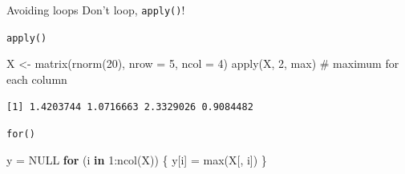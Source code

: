 \documentclass[
  ignorenonframetext,
]{beamer}
\newenvironment{Shaded}{\begin{snugshade}}{\end{snugshade}}
\newcommand{\AttributeTok}[1]{\textcolor[rgb]{0.00,0.34,0.68}{#1}}
\newcommand{\CommentTok}[1]{\textcolor[rgb]{0.54,0.53,0.53}{#1}}
\newcommand{\ConstantTok}[1]{\textcolor[rgb]{0.67,0.33,0.00}{#1}}
\newcommand{\ControlFlowTok}[1]{\textcolor[rgb]{0.12,0.11,0.11}{\textbf{#1}}}
\newcommand{\DecValTok}[1]{\textcolor[rgb]{0.69,0.50,0.00}{#1}}
\newcommand{\FunctionTok}[1]{\textcolor[rgb]{0.39,0.29,0.61}{#1}}
\newcommand{\NormalTok}[1]{\textcolor[rgb]{0.12,0.11,0.11}{#1}}
\newcommand{\OtherTok}[1]{\textcolor[rgb]{0.00,0.43,0.16}{#1}}
\newcommand{\SpecialCharTok}[1]{\textcolor[rgb]{0.24,0.68,0.91}{#1}}
\begin{document}
\begin{frame}[fragile]{Avoiding loops}
\protect\hypertarget{avoiding-loops}{}
Don't loop, \texttt{apply()}!

\texttt{apply()}

\begin{Shaded}
\begin{Highlighting}[]
\NormalTok{X }\OtherTok{\textless{}{-}} \FunctionTok{matrix}\NormalTok{(}\FunctionTok{rnorm}\NormalTok{(}\DecValTok{20}\NormalTok{),}
            \AttributeTok{nrow =} \DecValTok{5}\NormalTok{, }\AttributeTok{ncol =} \DecValTok{4}\NormalTok{)}
\FunctionTok{apply}\NormalTok{(X, }\DecValTok{2}\NormalTok{, max) }\CommentTok{\# maximum for each column}
\end{Highlighting}
\end{Shaded}

\begin{verbatim}
[1] 1.4203744 1.0716663 2.3329026 0.9084482
\end{verbatim}

\pause

\texttt{for()}

\begin{Shaded}
\begin{Highlighting}[]
\NormalTok{y }\OtherTok{=} \ConstantTok{NULL}
\ControlFlowTok{for}\NormalTok{ (i }\ControlFlowTok{in} \DecValTok{1}\SpecialCharTok{:}\FunctionTok{ncol}\NormalTok{(X)) \{}
\NormalTok{  y[i] }\OtherTok{=} \FunctionTok{max}\NormalTok{(X[, i])}
\NormalTok{\}}
\end{Highlighting}
\end{Shaded}
\end{frame}
\end{document}
